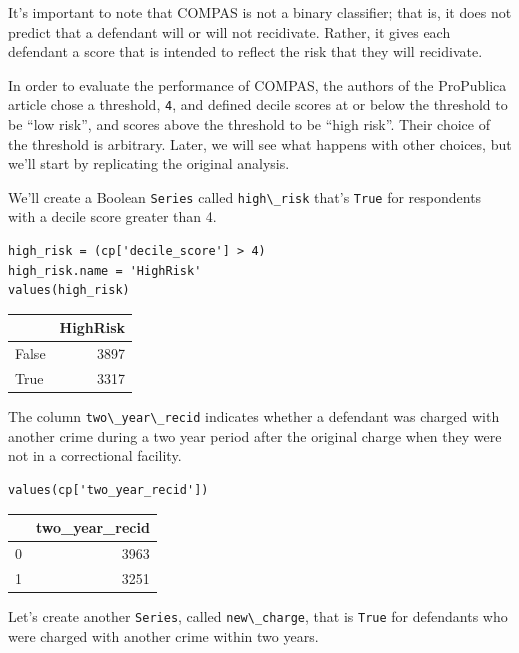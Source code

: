 It's important to note that COMPAS is not a binary classifier; that is,
it does not predict that a defendant will or will not recidivate.
Rather, it gives each defendant a score that is intended to reflect the
risk that they will recidivate.

In order to evaluate the performance of COMPAS, the authors of the
ProPublica article chose a threshold, \passthrough{\lstinline!4!}, and
defined decile scores at or below the threshold to be ``low risk'', and
scores above the threshold to be ``high risk''. Their choice of the
threshold is arbitrary. Later, we will see what happens with other
choices, but we'll start by replicating the original analysis.

We'll create a Boolean \passthrough{\lstinline!Series!} called
\passthrough{\lstinline!high\_risk!} that's
\passthrough{\lstinline!True!} for respondents with a decile score
greater than 4.

\begin{lstlisting}[]
high_risk = (cp['decile_score'] > 4)
high_risk.name = 'HighRisk'
values(high_risk)
\end{lstlisting}

\begin{tabular}{lr}
\midrule
{} &  HighRisk \\
\midrule
False &      3897 \\
True  &      3317 \\
\midrule
\end{tabular}

The column \passthrough{\lstinline!two\_year\_recid!} indicates whether
a defendant was charged with another crime during a two year period
after the original charge when they were not in a correctional facility.

\begin{lstlisting}[]
values(cp['two_year_recid'])
\end{lstlisting}

\begin{tabular}{lr}
\midrule
{} &  two\_year\_recid \\
\midrule
0 &            3963 \\
1 &            3251 \\
\midrule
\end{tabular}

Let's create another \passthrough{\lstinline!Series!}, called
\passthrough{\lstinline!new\_charge!}, that is
\passthrough{\lstinline!True!} for defendants who were charged with
another crime within two years.

